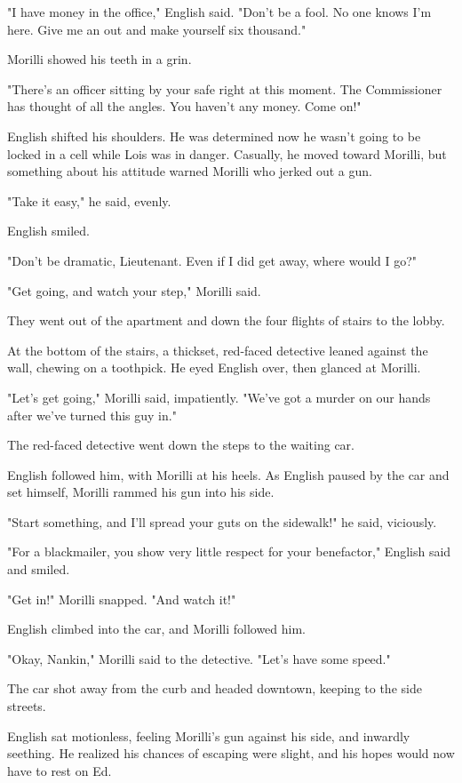 \documentclass{novel}
\begin{document}
"I have money in the office," English said. "Don't be a fool. No one knows I'm here. Give me an out and make yourself six thousand."

Morilli showed his teeth in a grin.

"There's an officer sitting by your safe right at this moment. The Commissioner has thought of all the angles. You haven't any money. Come on!"

English shifted his shoulders. He was determined now he wasn't going to be locked in a cell while Lois was in danger. Casually, he moved toward Morilli, but something about his attitude warned Morilli who jerked out a gun.

"Take it easy," he said, evenly.

English smiled.

"Don't be dramatic, Lieutenant. Even if I did get away, where would I go?"

"Get going, and watch your step," Morilli said.

They went out of the apartment and down the four flights of stairs to the lobby.

At the bottom of the stairs, a thickset, red-faced detective leaned against the wall, chewing on a toothpick. He eyed English over, then glanced at Morilli.

"Let's get going," Morilli said, impatiently. "We've got a murder on our hands after we've turned this guy in."

The red-faced detective went down the steps to the waiting car.

English followed him, with Morilli at his heels. As English paused by the car and set himself, Morilli rammed his gun into his side.

"Start something, and I'll spread your guts on the sidewalk!" he said, viciously.

"For a blackmailer, you show very little respect for your benefactor," English said and smiled.

"Get in!" Morilli snapped. "And watch it!"

English climbed into the car, and Morilli followed him.

"Okay, Nankin," Morilli said to the detective. "Let's have some speed."

The car shot away from the curb and headed downtown, keeping to the side streets.

English sat motionless, feeling Morilli's gun against his side, and inwardly seething. He realized his chances of escaping were slight, and his hopes would now have to rest on Ed.
\end{document}
